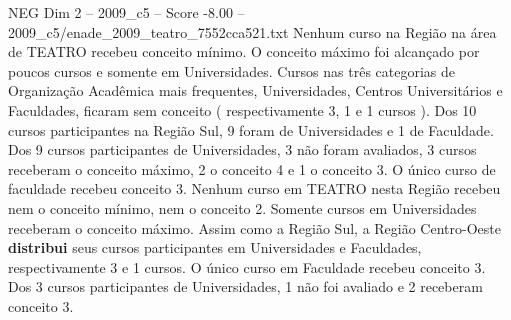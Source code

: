\begin{textsample}{NEG Dim 2 – 2009\_c5 – Score -8.00 – 2009\_c5/enade\_2009\_teatro\_7552cca521.txt}
Nenhum curso na Região na área de TEATRO recebeu conceito mínimo.
O conceito máximo foi alcançado por poucos cursos e somente em Universidades.
Cursos nas três categorias de Organização Acadêmica mais frequentes, Universidades, Centros Universitários e Faculdades, ficaram sem conceito ( respectivamente 3, 1 e 1 cursos ).
Dos 10 cursos participantes na Região Sul, 9 foram de Universidades e 1 de Faculdade.
Dos 9 cursos participantes de Universidades, 3 não foram avaliados, 3 cursos receberam o conceito máximo, 2 o conceito 4 e 1 o conceito 3.
O único curso de faculdade recebeu conceito 3.
Nenhum curso em TEATRO nesta Região recebeu nem o conceito mínimo, nem o conceito 2.
Somente cursos em Universidades receberam o conceito máximo.
Assim como a Região Sul, a Região Centro-Oeste \textbf{distribui} seus cursos participantes em Universidades e Faculdades, respectivamente 3 e 1 cursos.
O único curso em Faculdade recebeu conceito 3.
Dos 3 cursos participantes de Universidades, 1 não foi avaliado e 2 receberam conceito 3.

\end{textsample}
